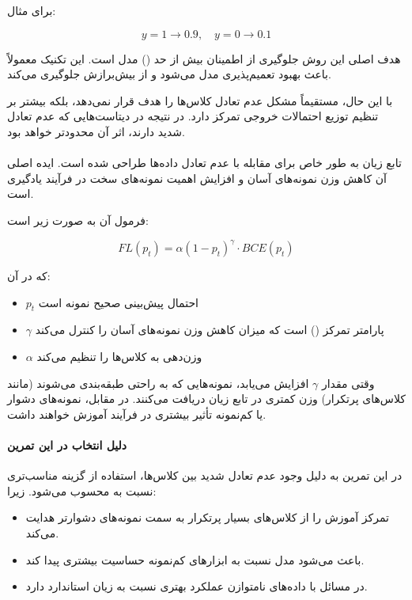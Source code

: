 \documentclass{article}
\begin{document}
برای مثال:

\[
y = 1 \rightarrow 0.9, \quad
y = 0 \rightarrow 0.1
\]

هدف اصلی این روش جلوگیری از اطمینان بیش از حد () مدل است. 
این تکنیک معمولاً باعث بهبود تعمیم‌پذیری مدل می‌شود و از بیش‌برازش جلوگیری می‌کند.

با این حال،  مستقیماً مشکل عدم تعادل کلاس‌ها را هدف قرار نمی‌دهد، 
بلکه بیشتر بر تنظیم توزیع احتمالات خروجی تمرکز دارد. 
در نتیجه در دیتاست‌هایی که عدم تعادل شدید دارند، اثر آن محدودتر خواهد بود.

\paragraph{}

تابع زیان  به طور خاص برای مقابله با عدم تعادل داده‌ها طراحی شده است. 
ایده اصلی آن کاهش وزن نمونه‌های آسان و افزایش اهمیت نمونه‌های سخت در فرآیند یادگیری است.

فرمول آن به صورت زیر است:

\[
FL(p_t) = \alpha (1 - p_t)^\gamma \cdot BCE(p_t)
\]

که در آن:

\begin{itemize}
	\item $p_t$ احتمال پیش‌بینی صحیح نمونه است
	\item $\gamma$ پارامتر تمرکز () است که میزان کاهش وزن نمونه‌های آسان را کنترل می‌کند
	\item $\alpha$ وزن‌دهی به کلاس‌ها را تنظیم می‌کند
\end{itemize}

وقتی مقدار $\gamma$ افزایش می‌یابد، نمونه‌هایی که به راحتی طبقه‌بندی می‌شوند 
(مانند کلاس‌های پرتکرار) وزن کمتری در تابع زیان دریافت می‌کنند. 
در مقابل، نمونه‌های دشوار یا کم‌نمونه تأثیر بیشتری در فرآیند آموزش خواهند داشت.

\paragraph{دلیل انتخاب  در این تمرین}

در این تمرین به دلیل وجود عدم تعادل شدید بین کلاس‌ها، استفاده از  
گزینه مناسب‌تری نسبت به  محسوب می‌شود. 
زیرا:

\begin{itemize}
	\item تمرکز آموزش را از کلاس‌های بسیار پرتکرار به سمت نمونه‌های دشوارتر هدایت می‌کند.
	\item باعث می‌شود مدل نسبت به ابزارهای کم‌نمونه حساسیت بیشتری پیدا کند.
	\item در مسائل  با داده‌های نامتوازن عملکرد بهتری نسبت به زیان استاندارد دارد.
\end{itemize}
\end{document}
